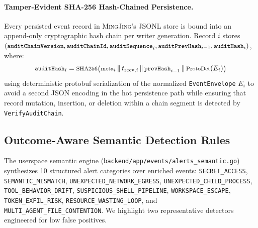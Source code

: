 \documentclass[10pt,twocolumn,letterpaper]{article}
\newcommand{\sys}{\textsc{MingJing}}
\newcommand{\code}[1]{\texttt{\small #1}}
\begin{document}
\paragraph{Tamper-Evident SHA-256 Hash-Chained Persistence.} Every persisted event record in \sys{}'s JSONL store is bound into an append-only cryptographic hash chain per writer generation. Record $i$ stores $(\code{auditChainVersion}, \code{auditChainId}, \code{auditSequence}_i, \code{auditPrevHash}_{i-1}, \code{auditHash}_i)$, where:
\begin{equation}
\footnotesize
  \code{auditHash}_i = \text{SHA256}\big(\text{meta}_i \,\|\, t_{\text{recv},i} \,\|\, \code{prevHash}_{i-1} \,\|\, \text{ProtoDet}(E_i)\big)
\end{equation}
using deterministic protobuf serialization of the normalized \code{EventEnvelope} $E_i$ to avoid a second JSON encoding in the hot persistence path while ensuring that record mutation, insertion, or deletion within a chain segment is detected by \code{VerifyAuditChain}.

\subsection{Outcome-Aware Semantic Detection Rules}
The userspace semantic engine (\code{backend/app/events/alerts\_semantic.go}) synthesizes 10 structured alert categories over enriched events: \code{SECRET\_ACCESS}, \code{SEMANTIC\_MISMATCH}, \code{UNEXPECTED\_NETWORK\_EGRESS}, \code{UNEXPECTED\_CHILD\_PROCESS}, \code{TOOL\_BEHAVIOR\_DRIFT}, \code{SUSPICIOUS\_SHELL\_PIPELINE}, \code{WORKSPACE\_ESCAPE}, \code{TOKEN\_EXFIL\_RISK}, \code{RESOURCE\_WASTING\_LOOP}, and \code{MULTI\_AGENT\_FILE\_CONTENTION}. We highlight two representative detectors engineered for low false positives.
\end{document}
